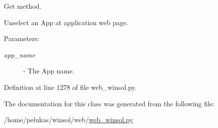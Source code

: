 Get method. 

Unselect an App at application web page.

\begin{Desc}
\item[Parameters:]
\begin{description}
\item[{\em app\_\-name}]- The App name. \end{description}
\end{Desc}


Definition at line 1278 of file web\_\-winsol.py.

The documentation for this class was generated from the following file:\begin{CompactItemize}
\item 
/home/pelukas/winsol/web/\hyperlink{web__winsol_8py}{web\_\-winsol.py}\end{CompactItemize}
